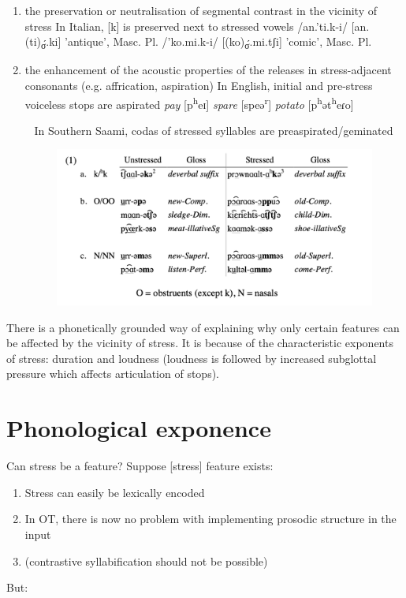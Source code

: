 \documentclass[a4paper, 12pt]{article}
\begin{document}
	\begin{enumerate}[$\gg$]
		\item the preservation or neutralisation of segmental contrast in the vicinity of stress
	\pex In Italian, [k] is preserved next to stressed vowels
		\a /an.'ti.k-i/ [an.(ti)\textsubscript{{\'σ}}.ki] 'antique', Masc. Pl. 
		\a /'ko.mi.k-i/ [(ko)\textsubscript{{\'σ}}.mi.tʃi] 'comic', Masc. Pl. 
	\xe
		\item the enhancement of the acoustic properties of the releases in stress-adjacent consonants (e.g. affrication, aspiration)
	\pex In English, initial and pre-stress voiceless stops are aspirated
		\a \emph{pay} [p\textsuperscript{h}eɪ]
		\a \emph{spare} [speə\textsuperscript{r}]
		\a \emph{potato} [p\textsuperscript{h}ət\textsuperscript{h}eɾo]
	\xe
	
	\pex~ In Southern Saami, codas of stressed syllables are preaspirated/geminated
		\begin{figure}[H]
			\centering
			\includegraphics[width=.9\textwidth]{enguehard2014}
		\end{figure}
	\xe
	\end{enumerate}
	There is a phonetically grounded way of explaining why only certain features can be affected by the vicinity of stress. It is because of the characteristic exponents of stress: duration and loudness (loudness is followed by increased subglottal pressure which affects articulation of stops). 

		\section{Phonological exponence}
		
	Can stress be a feature? Suppose [stress] feature exists:
	
	\begin{enumerate}[$\gg$]
		\item Stress can easily be lexically encoded
		\item In OT, there is now no problem with implementing prosodic structure in the input \parencite{delacy2019}
		\item (contrastive syllabification should not be possible)
	\end{enumerate}
	But:
	
\end{document}
